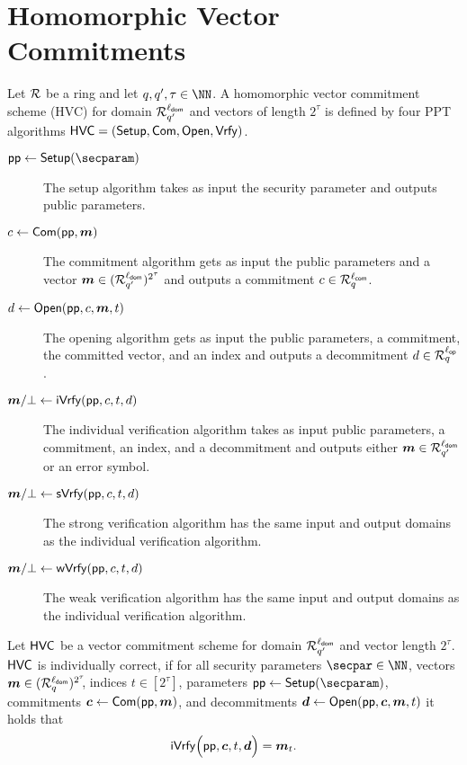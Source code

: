\section{Homomorphic Vector Commitments}\label{sec:veccom}

\begin{definition}\label{def:hvc}
  Let $\mathcal{R}$ be a ring and let $q,q',\tau\in\NN$.
  A homomorphic vector commitment scheme (HVC) for domain $\mathcal{R}^{\ell_{\mathsf{dom}}}_{q'}$ and vectors of length $2^\tau$ is defined by four PPT algorithms $\mathsf{HVC}=(\mathsf{Setup},\mathsf{Com},\allowbreak\mathsf{Open},\mathsf{Vrfy})$.
\begin{description}
    \item[$\params\gets\setup(\secparam)$] The setup algorithm takes as input the security parameter and outputs public parameters.
    \item[$c \gets \mathsf{Com}(\mathsf{pp},\boldsymbol{m})$] The commitment algorithm gets as input the public parameters and a vector $\boldsymbol{m}\in(\mathcal{R}_{q'}^{\ell_{\mathsf{dom}}})^{2^\tau}$ and outputs a commitment $c\in\mathcal{R}_q^{\ell_{\mathsf{com}}}$.
    \item[$d \gets \mathsf{Open}(\mathsf{pp},c,\boldsymbol{m},t)$] The opening algorithm gets as input the public parameters, a commitment, the committed vector, and an index and outputs a decommitment $d\in\mathcal{R}_q^{{\ell_{\mathsf{op}}}}$.
    \item[$\boldsymbol{m}/\bot\gets \mathsf{iVrfy}(\mathsf{pp},c,t,d)$] The individual verification algorithm takes as input public parameters, a commitment, an index, and a decommitment and outputs either $\boldsymbol{m}\in\mathcal{R}^{\ell_{\mathsf{dom}}}_{q'}$ or an error symbol.
    \item[$\boldsymbol{m}/\bot\gets \mathsf{sVrfy}(\mathsf{pp},c,t,d)$] The strong verification algorithm has the same input and output domains as the individual verification algorithm.
    \item[$\boldsymbol{m}/\bot\gets \mathsf{wVrfy}(\mathsf{pp},c,t,d)$] The weak verification algorithm has the same input and output domains as the individual verification algorithm.
  \end{description}
\end{definition}
\begin{definition}
Let $\mathsf{HVC}$ be a vector commitment scheme for domain $\mathcal{R}^{\ell_{\mathsf{dom}}}_{q'}$ and vector length $2^\tau$.
  $\mathsf{HVC}$ is individually correct, if for all security parameters $\secpar\in\NN$, vectors $\boldsymbol{m}\in(\mathcal{R}_q^{\ell_{\mathsf{dom}}})^{2^\tau}\!\!$, indices $t\in[2^\tau]$, parameters $\params \gets \setup(\secparam)$, commitments $\boldsymbol{c} \gets \mathsf{Com}(\mathsf{pp},\boldsymbol{m})$, and decommitments $\boldsymbol{d} \gets \mathsf{Open}(\mathsf{pp},\boldsymbol{c},\boldsymbol{m},t)$ it holds that
  \[
    \mathsf{iVrfy}\Bigl(\mathsf{pp},\boldsymbol{c},t,\boldsymbol{d}\Bigr) = \boldsymbol{m}_{t}.
  \]
\end{definition}


